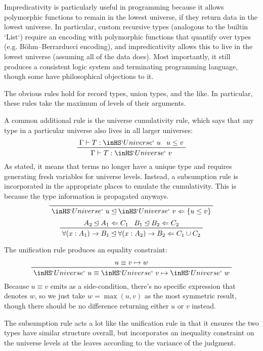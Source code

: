 \documentclass[11pt, twoside, reqno]{book}
\newcommand{\subsumedBy}{\unlhd}
\begin{document}
Impredicativity is particularly useful in programming because it allows polymorphic functions to remain in the lowest universe, if they return data in the lowest universe.
In particular, custom recursive types (analogous to the builtin \inHS`List`) require an encoding with polymorphic functions that quantify over types (e.g. B\"ohm--Berrarducci encoding), and impredicativity allows this to live in the lowest universe (assuming all of the data does).
Most importantly, it still produces a consistent logic system and terminating programming language, though some have philosophical objections to it.

The obvious rules hold for record types, union types, and the like.
In particular, these rules take the maximum of levels of their arguments.

A common additional rule is the universe cumulativity rule, which says that any type in a particular universe also lives in all larger universes:
\begin{displaymath}
\prftree{\Gamma \vdash T : \inHS`Universe`\ u}{u \le v}{\Gamma \vdash T : \inHS`Universe`\ v}
\end{displaymath}
As stated, it means that terms no longer have a unique type and requires generating fresh variables for universe levels.
Instead, a subsumption rule is incorporated in the appropriate places to emulate the cumulativity.
This is because the type information is propagated anyways.
\begin{displaymath}
\prftree{\inHS`Universe`\ u \subsumedBy \inHS`Universe`\ v \Leftarrow \{u \le v\}}
\end{displaymath}
\begin{displaymath}
\prftree{A_2 \subsumedBy A_1 \Leftarrow C_1}{B_1 \subsumedBy B_2 \Leftarrow C_2}{\forall(x : A_1) \to B_1 \subsumedBy \forall(x : A_2) \to B_2 \Leftarrow C_1 \cup C_2}
\end{displaymath}

The unification rule produces an equality constraint:
\begin{displaymath}
\prftree{u \equiv v \mapsto w}{\inHS`Universe`\ u \equiv \inHS`Universe`\ v \mapsto \inHS`Universe`\ w}
\end{displaymath}
Because \(u \equiv v\) emits as a side-condition, there's no specific expression that denotes \(w\), so we just take \(w = \max(u,v)\) as the most symmetric result, though there should be no difference returning either \(u\) or \(v\) instead.

The subsumption rule acts a lot like the unification rule in that it ensures the two types have similar structure overall, but incorporates an inequality constraint on the universe levels at the leaves according to the variance of the judgment.
\end{document}
